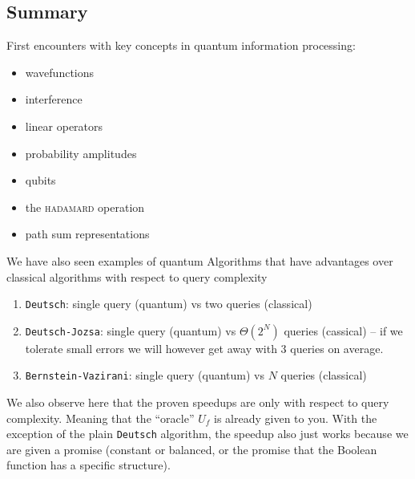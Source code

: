 \subsection{Summary}
First encounters with key concepts in quantum information processing:
\begin{itemize}
    \item wavefunctions
    \item interference
    \item linear operators 
    \item probability amplitudes
    \item qubits
    \item the \textsc{hadamard} operation
    \item path sum representations
\end{itemize}


We have also seen examples of quantum Algorithms that have advantages over classical algorithms with respect to query complexity
\begin{enumerate}
    \item \texttt{Deutsch}: single query (quantum) vs two queries (classical)
    \item \texttt{Deutsch-Jozsa}: single query (quantum) vs $\Theta(2^N)$ queries (cassical) -- if we tolerate small errors we will however get away with $3$ queries on average.
    \item \texttt{Bernstein-Vazirani}: single query (quantum) vs $N$ queries (classical)
\end{enumerate}

We also observe here that the proven speedups are only with respect to query complexity. Meaning that the ``oracle'' $U_f$ is already given to you. With the exception of the plain \texttt{Deutsch} algorithm, the speedup also just works because we are given a promise (constant or balanced, or the promise that the Boolean function has a specific structure).
